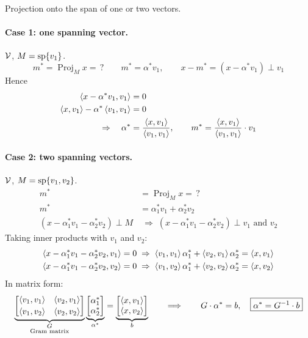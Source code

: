 \begin{example}
Projection onto the span of one or two vectors.

\paragraph{Case 1: one spanning vector.} $\mathcal{V}$, \quad $M=\operatorname{sp}\{v_1\}$.
\[
m^* = \operatorname{Proj}_M x = \,? \qquad m^* = \alpha^* v_1, \qquad x-m^* = (x-\alpha^* v_1)\perp v_1
\]
Hence
\begin{align*}
\left\langle x-\alpha^* v_1, v_1 \right\rangle &= 0\\
\left\langle x, v_1 \right\rangle - \alpha^*\left\langle v_1, v_1 \right\rangle &= 0\\
\Rightarrow\quad \alpha^* &= \frac{\left\langle x, v_1 \right\rangle}{\left\langle v_1, v_1 \right\rangle}, \qquad m^* = \frac{\left\langle x, v_1 \right\rangle}{\left\langle v_1, v_1 \right\rangle}\cdot v_1
\end{align*}

\paragraph{Case 2: two spanning vectors.} $\mathcal{V}$, \quad $M=\operatorname{sp}\{v_1,v_2\}$.
\begin{align*}
m^* &= \operatorname{Proj}_M x = \,?\\
m^* &= \alpha_1^* v_1 + \alpha_2^* v_2\\
(x-\alpha_1^* v_1 - \alpha_2^* v_2)\perp M &\;\Rightarrow\; (x-\alpha_1^* v_1-\alpha_2^* v_2)\perp v_1 \text{ and } v_2
\end{align*}
Taking inner products with $v_1$ and $v_2$:
\begin{align*}
\left\langle x-\alpha_1^* v_1-\alpha_2^* v_2, v_1 \right\rangle = 0 &\;\Rightarrow\; \left\langle v_1, v_1 \right\rangle\alpha_1^* + \left\langle v_2, v_1 \right\rangle\alpha_2^* = \left\langle x, v_1 \right\rangle\\
\left\langle x-\alpha_1^* v_1-\alpha_2^* v_2, v_2 \right\rangle = 0 &\;\Rightarrow\; \left\langle v_1, v_2 \right\rangle\alpha_1^* + \left\langle v_2, v_2 \right\rangle\alpha_2^* = \left\langle x, v_2 \right\rangle
\end{align*}
In matrix form:
\begin{gather*}
\underbrace{\begin{bmatrix}\left\langle v_1, v_1 \right\rangle & \left\langle v_2, v_1 \right\rangle\\[2pt] \left\langle v_1, v_2 \right\rangle & \left\langle v_2, v_2 \right\rangle\end{bmatrix}}_{\substack{G\\ \text{Gram matrix}}}
\underbrace{\begin{bmatrix}\alpha_1^*\\ \alpha_2^*\end{bmatrix}}_{\alpha^*}
= \underbrace{\begin{bmatrix}\left\langle x, v_1 \right\rangle\\ \left\langle x, v_2 \right\rangle\end{bmatrix}}_{b}
\qquad\Longrightarrow\qquad
G\cdot\alpha^* = b, \quad \boxed{\alpha^* = G^{-1}\cdot b}
\end{gather*}


\end{example}
